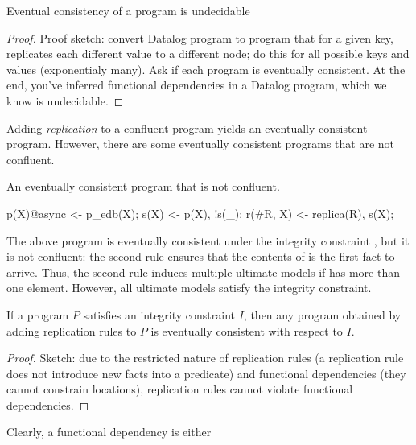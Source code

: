 \begin{lemma}
Eventual consistency of a \lang program is undecidable
\end{lemma}
\begin{proof}
Proof sketch: convert Datalog program to \lang program that for a given key, replicates each different value to a different node; do this for all possible keys and values (exponentialy many).  Ask if each program is eventually consistent.  At the end, you've inferred functional dependencies in a Datalog program, which we know is undecidable.
\end{proof}

Adding {\em replication}  to a confluent program yields an eventually consistent program.  However, there are some eventually consistent programs that are not confluent.

\begin{example}
An eventually consistent program that is not confluent.

\begin{Dedalus}
p(X)@async <- p_edb(X);
s(X) <- p(X), !s(_);
r(#R, X) <- replica(R), s(X);
\end{Dedalus}
\end{example}

The above program is eventually consistent under the integrity constraint , but it is not confluent: the second rule ensures that the contents of  is the first  fact to arrive.  Thus, the second rule induces multiple ultimate models if  has more than one element.  However, all ultimate models satisfy the integrity constraint.

\begin{lemma}
If a program $P$ satisfies an integrity constraint $I$, then any program obtained by adding replication rules to $P$ is eventually consistent with respect to $I$.
\end{lemma}
\begin{proof}
Sketch: due to the restricted nature of replication rules (a replication rule does not introduce new facts into a predicate) and functional dependencies (they cannot constrain locations), replication rules cannot violate functional dependencies.
\end{proof}

Clearly, a functional dependency is either

\begin{lemma}

\end{lemma}
